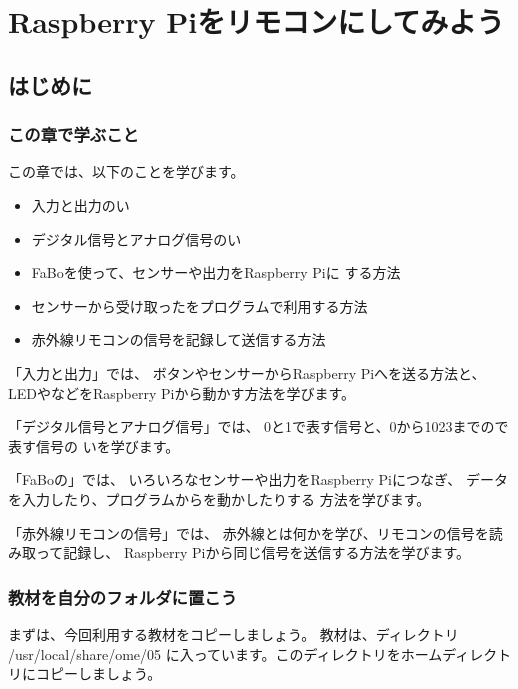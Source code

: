 \documentclass[text05.tex]{subfiles}
\begin{document}
\chapter{Raspberry Piをリモコンにしてみよう}
\section{はじめに}
\subsection{この章で学ぶこと}

この章では、以下のことを学びます。

\begin{itemize}
  \item 入力と出力のい
  \item デジタル信号とアナログ信号のい
  \item FaBoを使って、センサーや出力をRaspberry Piに
        する方法
  \item センサーから受け取ったをプログラムで利用する方法
  \item 赤外線リモコンの信号を記録して送信する方法
\end{itemize}

「入力と出力」では、
ボタンやセンサーからRaspberry Piへを送る方法と、
LEDやなどをRaspberry Piから動かす方法を学びます。

「デジタル信号とアナログ信号」では、
0と1で表す信号と、0から1023までので表す信号の
いを学びます。

「FaBoの」では、
いろいろなセンサーや出力をRaspberry Piにつなぎ、
データを入力したり、プログラムからを動かしたりする
方法を学びます。

「赤外線リモコンの信号」では、
赤外線とは何かを学び、リモコンの信号を読み取って記録し、
Raspberry Piから同じ信号を送信する方法を学びます。

\subsection{教材を自分のフォルダに置こう}
まずは、今回利用する教材をコピーしましょう。
教材は、ディレクトリ \nobreak/usr/local/share/ome/05 に入っています。このディレクトリをホームディレクトリにコピーしましょう。
\end{document}

